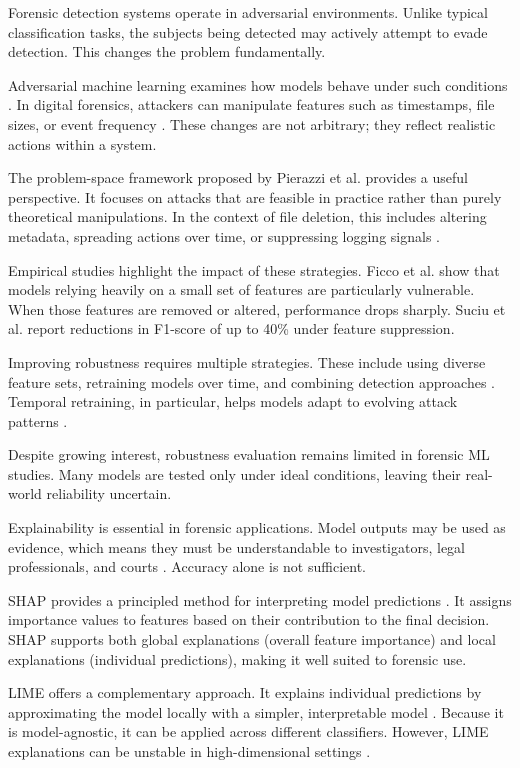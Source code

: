 Forensic detection systems operate in adversarial environments. Unlike typical classification tasks, the subjects being detected may actively attempt to evade detection. This changes the problem fundamentally.

Adversarial machine learning examines how models behave under such conditions \cite{ref48}. In digital forensics, attackers can manipulate features such as timestamps, file sizes, or event frequency \cite{ref8}. These changes are not arbitrary; they reflect realistic actions within a system.

The problem-space framework proposed by Pierazzi et al. \cite{ref49} provides a useful perspective. It focuses on attacks that are feasible in practice rather than purely theoretical manipulations. In the context of file deletion, this includes altering metadata, spreading actions over time, or suppressing logging signals \cite{ref51}.

Empirical studies highlight the impact of these strategies. Ficco et al. \cite{ref52} show that models relying heavily on a small set of features are particularly vulnerable. When those features are removed or altered, performance drops sharply. Suciu et al. \cite{ref53} report reductions in F1-score of up to 40\% under feature suppression.

Improving robustness requires multiple strategies. These include using diverse feature sets, retraining models over time, and combining detection approaches \cite{ref54}. Temporal retraining, in particular, helps models adapt to evolving attack patterns \cite{ref14}.

Despite growing interest, robustness evaluation remains limited in forensic ML studies. Many models are tested only under ideal conditions, leaving their real-world reliability uncertain.

Explainability is essential in forensic applications. Model outputs may be used as evidence, which means they must be understandable to investigators, legal professionals, and courts \cite{ref15}. Accuracy alone is not sufficient.

SHAP provides a principled method for interpreting model predictions \cite{ref55,ref56}. It assigns importance values to features based on their contribution to the final decision. SHAP supports both global explanations (overall feature importance) and local explanations (individual predictions), making it well suited to forensic use.

LIME offers a complementary approach. It explains individual predictions by approximating the model locally with a simpler, interpretable model \cite{ref58}. Because it is model-agnostic, it can be applied across different classifiers. However, LIME explanations can be unstable in high-dimensional settings \cite{ref59}.

